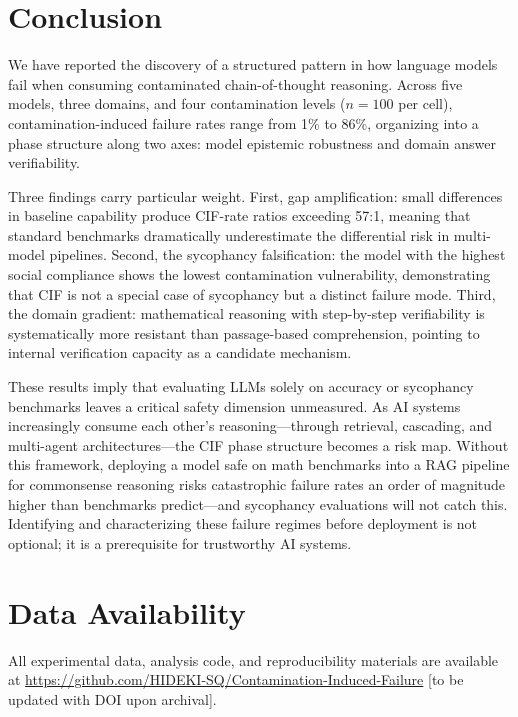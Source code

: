 \documentclass[aps,prx,reprint,twocolumn,superscriptaddress,longbibliography]{revtex4-2}
\begin{document}
\section{Conclusion}

We have reported the discovery of a structured pattern in how language models fail when consuming contaminated chain-of-thought reasoning. Across five models, three domains, and four contamination levels ($n=100$ per cell), contamination-induced failure rates range from 1\% to 86\%, organizing into a phase structure along two axes: model epistemic robustness and domain answer verifiability.

Three findings carry particular weight. First, gap amplification: small differences in baseline capability produce CIF-rate ratios exceeding 57:1, meaning that standard benchmarks dramatically underestimate the differential risk in multi-model pipelines. Second, the sycophancy falsification: the model with the highest social compliance shows the lowest contamination vulnerability, demonstrating that CIF is not a special case of sycophancy but a distinct failure mode. Third, the domain gradient: mathematical reasoning with step-by-step verifiability is systematically more resistant than passage-based comprehension, pointing to internal verification capacity as a candidate mechanism.

These results imply that evaluating LLMs solely on accuracy or sycophancy benchmarks leaves a critical safety dimension unmeasured. As AI systems increasingly consume each other's reasoning---through retrieval, cascading, and multi-agent architectures---the CIF phase structure becomes a risk map. Without this framework, deploying a model safe on math benchmarks into a RAG pipeline for commonsense reasoning risks catastrophic failure rates an order of magnitude higher than benchmarks predict---and sycophancy evaluations will not catch this. Identifying and characterizing these failure regimes before deployment is not optional; it is a prerequisite for trustworthy AI systems.



\section*{Data Availability}

All experimental data, analysis code, and reproducibility materials are available at \url{https://github.com/HIDEKI-SQ/Contamination-Induced-Failure} [to be updated with DOI upon archival].
\end{document}
